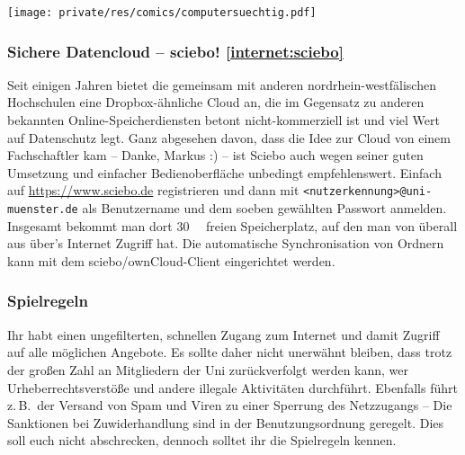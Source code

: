 \begin{multicols}{2}
\begin{center}
	\texttt{[image: private/res/comics/computersuechtig.pdf]}
\end{center}

\subsubsection[Sichere Datencloud -- sciebo!]{Sichere Datencloud -- sciebo! \cref{internet:sciebo}}
Seit einigen Jahren bietet die \UniMuenster{} gemeinsam mit anderen nordrhein-westfälischen Hochschulen eine Dropbox-ähnliche Cloud an, die im Gegensatz zu anderen bekannten Online-Speicherdiensten betont nicht-kommerziell ist und viel Wert auf Datenschutz legt.
Ganz abgesehen davon, dass die Idee zur Cloud von einem Fachschaftler kam -- Danke, Markus :) -- ist Sciebo auch wegen seiner guten Umsetzung und einfacher Bedienoberfläche unbedingt empfehlenswert.
Einfach auf \url{https://www.sciebo.de} registrieren und dann mit \texttt{<nutzerkennung>@uni-muenster.de} als Benutzername und dem soeben gewählten Passwort anmelden.
Insgesamt bekommt man dort \SI{30}{\giga\byte} freien Speicherplatz, auf den man von überall aus über's Internet Zugriff hat.
Die automatische Synchronisation von Ordnern kann mit dem sciebo/ownCloud-Client eingerichtet werden.

\subsubsection{Spielregeln}
Ihr habt einen ungefilterten, schnellen Zugang zum Internet und damit Zugriff auf alle möglichen Angebote.
Es sollte daher nicht unerwähnt bleiben, dass trotz der großen Zahl an Mitgliedern der Uni zurückverfolgt werden kann, wer Urheberrechtsverstöße und andere illegale Aktivitäten durchführt.
Ebenfalls führt z.\,B.\ der Versand von Spam und Viren zu einer Sperrung des Netzzugangs -- Die Sanktionen bei Zuwiderhandlung sind in der Benutzungsordnung geregelt.
Dies soll euch nicht abschrecken, dennoch solltet ihr die Spielregeln kennen.


\end{multicols}
